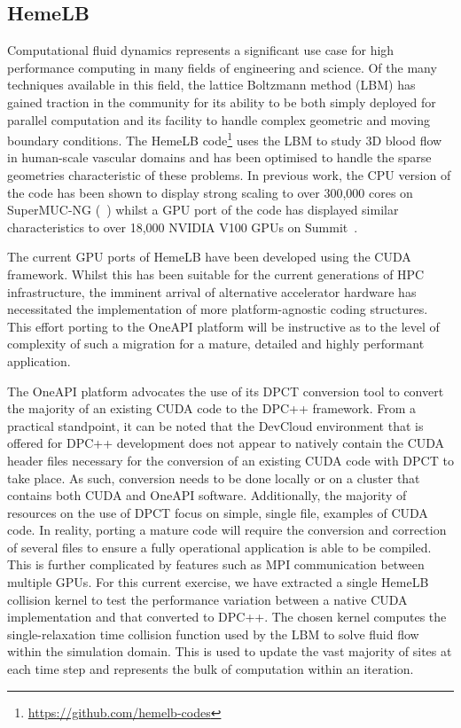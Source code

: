 \documentclass[../main]{subfiles}
\begin{document}
\subsection{HemeLB}\label{sec:hemelb}

Computational fluid dynamics represents a significant use case for high performance computing in many fields of engineering and science.
Of the many techniques available in this field, the lattice Boltzmann method (LBM) has gained traction in the community for its ability to be both simply deployed for parallel computation and its facility to handle complex geometric and moving boundary conditions.
The HemeLB code\footnote{\url{https://github.com/hemelb-codes}} uses the LBM to study 3D blood flow in human-scale vascular domains and has been optimised to handle the sparse geometries characteristic of these problems.
In previous work, the CPU version of the code has been shown to display strong scaling to over 300,000 cores on SuperMUC-NG (~\cite{mccullough2021towards}) whilst a GPU port of the code has displayed similar characteristics to over 18,000 NVIDIA V100 GPUs on Summit~\cite{zacharoudiou_development_2022}.

The current GPU ports of HemeLB have been developed using the CUDA framework.
Whilst this has been suitable for the current generations of HPC infrastructure, the imminent arrival of alternative accelerator hardware has necessitated the implementation of more platform-agnostic coding structures.
This effort porting to the OneAPI platform will be instructive as to the level of complexity of such a migration for a mature, detailed and highly performant application.

The OneAPI platform advocates the use of its DPCT conversion tool to convert the majority of an existing CUDA code to the DPC++ framework.
From a practical standpoint, it can be noted that the DevCloud environment that is offered for DPC++ development does not appear to natively contain the CUDA header files necessary for the conversion of an existing CUDA code with DPCT to take place.
As such, conversion needs to be done locally or on a cluster that contains both CUDA and OneAPI software.
Additionally, the majority of resources on the use of DPCT focus on simple, single file, examples of CUDA code.
In reality, porting a mature code will require the conversion and correction of several files to ensure a fully operational application is able to be compiled.
This is further complicated by features such as MPI communication between multiple GPUs.
For this current exercise, we have extracted a single HemeLB collision kernel to test the performance variation between a native CUDA implementation and that converted to DPC++.
The chosen kernel computes the single-relaxation time collision function used by the LBM to solve fluid flow within the simulation domain.
This is used to update the vast majority of sites at each time step and represents the bulk of computation within an iteration.
\end{document}
